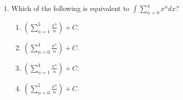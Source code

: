 \documentclass{article}
\begin{document}
\begin{enumerate}
\begin{enumerate}
  \end{enumerate}
  
  
  \item Which of the following is equivalent to $\int \sum_{n=0}^4 x^n dx$? 
  \begin{enumerate}
    \item $\left(\sum_{n=1}^5 \frac{x^n}{n}\right)+C$.  %
    \item $\left(\sum_{n=0}^4 \frac{x^n}{n}\right)+C$.
    \item $\left(\sum_{n=1}^4 \frac{x^n}{n}\right)+C$.
    \item $\left(\sum_{n=0}^5 \frac{x^n}{n}\right)+C$.
   
  \end{enumerate}


  
  
  
    
\end{enumerate}
\end{document}
